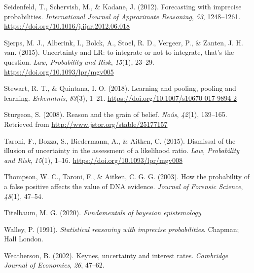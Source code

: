 \documentclass[
  10pt,
  dvipsnames,enabledeprecatedfontcommands]{scrartcl}
\newlength{\cslhangindent}
\newlength{\cslentryspacingunit} %
\newenvironment{CSLReferences}[2] %
 {%
  \setlength{\parindent}{0pt}
  \ifodd #1
  \let\oldpar\par
  \def\par{\hangindent=\cslhangindent\oldpar}
  \fi
  \setlength{\parskip}{#2\cslentryspacingunit}
 }%
 {}
\begin{document}
\begin{CSLReferences}{1}{0}
\leavevmode{}%
Seidenfeld, T., Schervish, M., \& Kadane, J. (2012). Forecasting with
imprecise probabilities. \emph{International Journal of Approximate
Reasoning}, \emph{53}, 1248--1261.
\url{https://doi.org/10.1016/j.ijar.2012.06.018}

\leavevmode{}%
Sjerps, M. J., Alberink, I., Bolck, A., Stoel, R. D., Vergeer, P., \&
Zanten, J. H. van. (2015). {Uncertainty and LR: to integrate or not to
integrate, that's the question}. \emph{Law, Probability and Risk},
\emph{15}(1), 23--29. \url{https://doi.org/10.1093/lpr/mgv005}

\leavevmode{}%
Stewart, R. T., \& Quintana, I. O. (2018). Learning and pooling, pooling
and learning. \emph{Erkenntnis}, \emph{83}(3), 1--21.
\url{https://doi.org/10.1007/s10670-017-9894-2}

\leavevmode{}%
Sturgeon, S. (2008). Reason and the grain of belief. \emph{No{û}s},
\emph{42}(1), 139--165. Retrieved from
\url{http://www.jstor.org/stable/25177157}

\leavevmode{}%
Taroni, F., Bozza, S., Biedermann, A., \& Aitken, C. (2015). {Dismissal
of the illusion of uncertainty in the assessment of a likelihood ratio}.
\emph{Law, Probability and Risk}, \emph{15}(1), 1--16.
\url{https://doi.org/10.1093/lpr/mgv008}

\leavevmode{}%
Thompson, W. C., Taroni, F., \& Aitken, C. G. G. (2003). How the
probability of a false positive affects the value of {DNA} evidence.
\emph{Journal of Forensic Science}, \emph{48}(1), 47--54.

\leavevmode{}%
Titelbaum, M. G. (2020). \emph{Fundamentals of bayesian epistemology}.

\leavevmode{}%
Walley, P. (1991). \emph{Statistical reasoning with imprecise
probabilities}. Chapman; Hall London.

\leavevmode{}%
Weatherson, B. (2002). Keynes, uncertainty and interest rates.
\emph{Cambridge Journal of Economics}, \emph{26}, 47--62.

\end{CSLReferences}
\end{document}
